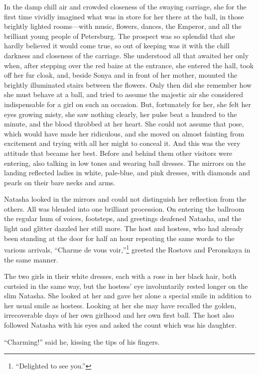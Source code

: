 In the damp chill air and crowded closeness of the swaying
carriage, she for the first time vividly imagined what was in
store for her there at the ball, in those brightly lighted
rooms---with music, flowers, dances, the Emperor, and all the
brilliant young people of Petersburg. The prospect was so
splendid that she hardly believed it would come true, so out of
keeping was it with the chill darkness and closeness of the
carriage. She understood all that awaited her only when, after
stepping over the red baize at the entrance, she entered the
hall, took off her fur cloak, and, beside Sonya and in front of
her mother, mounted the brightly illuminated stairs between the
flowers. Only then did she remember how she must behave at a
ball, and tried to assume the majestic air she considered
indispensable for a girl on such an occasion. But, fortunately
for her, she felt her eyes growing misty, she saw nothing
clearly, her pulse beat a hundred to the minute, and the blood
throbbed at her heart. She could not assume that pose, which
would have made her ridiculous, and she moved on almost fainting
from excitement and trying with all her might to conceal it. And
this was the very attitude that became her best. Before and
behind them other visitors were entering, also talking in low
tones and wearing ball dresses. The mirrors on the landing
reflected ladies in white, pale-blue, and pink dresses, with
diamonds and pearls on their bare necks and arms.

Natasha looked in the mirrors and could not distinguish her
reflection from the others. All was blended into one brilliant
procession. On entering the ballroom the regular hum of voices,
footsteps, and greetings deafened Natasha, and the light and
glitter dazzled her still more. The host and hostess, who had
already been standing at the door for half an hour repeating the
same words to the various arrivals, ``Charme de vous
voir,''\footnote{``Delighted to see you.''} greeted the Rostovs
and Peronskaya in the same manner.

The two girls in their white dresses, each with a rose in her
black hair, both curtsied in the same way, but the hostess' eye
involuntarily rested longer on the slim Natasha. She looked at
her and gave her alone a special smile in addition to her usual
smile as hostess. Looking at her she may have recalled the
golden, irrecoverable days of her own girlhood and her own first
ball. The host also followed Natasha with his eyes and asked the
count which was his daughter.

``Charming!'' said he, kissing the tips of his fingers.

